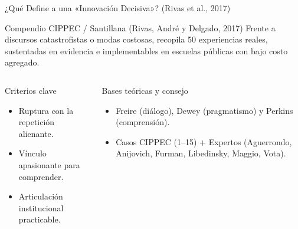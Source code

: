 \documentclass[aspectratio=169,spanish,xcolor=table]{beamer}
\begin{document}
\begin{frame}{¿Qué Define a una «Innovación Decisiva»? (Rivas et al., 2017)}
  \begin{block}{Compendio CIPPEC / Santillana (Rivas, André y Delgado, 2017)}
    Frente a discursos catastrofistas o modas costosas, recopila 50 experiencias reales, sustentadas en evidencia e implementables en escuelas públicas con bajo costo agregado.
  \end{block}
  \vspace{0.25cm}
  \begin{columns}[T]
      \begin{block}{Criterios clave}
        \begin{itemize}\scriptsize
          \item Ruptura con la repetición alienante.
          \item Vínculo apasionante para comprender.
          \item Articulación institucional practicable.
        \end{itemize}
      \end{block}
      \begin{block}{Bases teóricas y consejo}
        \begin{itemize}\scriptsize
          \item Freire (diálogo), Dewey (pragmatismo) y Perkins (comprensión).
          \item Casos CIPPEC (1--15) + Expertos (Aguerrondo, Anijovich, Furman, Libedinsky, Maggio, Vota).
        \end{itemize}
      \end{block}
  \end{columns}
\end{frame}
\end{document}
